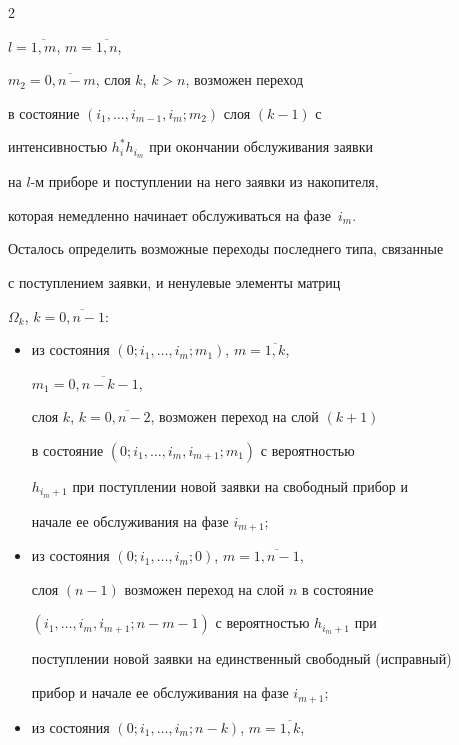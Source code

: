 \begin{multicols}{2}
\begin{itemize}
$l=\overline{1,m}$, $m=\overline{1,n}$,


$m_2=\overline{0,n-m}$, слоя $k$, $k>n$, возможен переход


в состояние $\left(i_1,\ldots, i_{m-1},i_m;m_2\right)$ слоя $(k-1)$ с


интенсивностью $h_i^*h_{i_m}$ при окончании обслуживания заявки


на $l$-м приборе и поступлении на него заявки из накопителя,


которая немедленно начинает обслуживаться на фазе~$i_m$.


\end{itemize}





Осталось определить возможные переходы последнего типа, связанные


с поступлением заявки, и ненулевые элементы матриц


$\Omega_k$, $k=\overline{0,n-1}$:


\begin{itemize}


\item из состояния $\left(0;i_1,\ldots,i_m;m_1\right)$, $m=\overline{1,k}$,


$m_1=\overline{0,n-k-1}$,


слоя $k$, $k=\overline{0,n-2}$, возможен переход на слой $(k+1)$


в состояние $\left(0;i_1,\ldots,i_m,i_{m+1};m_1\right)$ с вероятностью


$h_{i_m+1}$ при поступлении новой заявки на свободный прибор и


начале ее обслуживания на фазе $i_{m+1}$;


\item


из состояния $\left(0;i_1,\ldots,i_m;0\right)$, $m=\overline{1,n-1}$,


слоя $(n-1)$ возможен переход на слой $n$ в состояние


$\left(i_1,\ldots,i_m,i_{m+1};n-m-1\right)$ с вероятностью $h_{i_m+1}$ при


поступлении новой заявки на единственный свободный (исправный)


прибор и начале ее обслуживания на фазе $i_{m+1}$;


\item


из состояния $\left(0;i_1,\ldots,i_m;n-k\right)$, $m=\overline{1,k}$,



\end{itemize}
\end{multicols}
